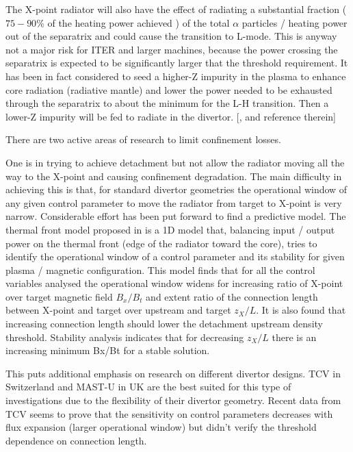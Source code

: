 The X-point radiator will also have the effect of radiating a substantial fraction ($75-90\%$ of the heating power achieved \cite{Bernert2017}) of the total $ \alpha $ particles / heating power out of the separatrix and could cause the transition to L-mode. This is anyway not a major risk for ITER and larger machines, because the power crossing the separatrix is expected to be significantly larger that the threshold requirement. It has been in fact considered to seed a higher-Z impurity in the plasma to enhance core radiation (radiative mantle) and lower the power needed to be exhausted through the separatrix to about the minimum for the L-H transition. Then a lower-Z impurity will be fed to radiate in the divertor. [\cite{Kallenbach2015a},\cite{Reinke2013} and reference therein]


There are two active areas of research to limit confinement losses.

One is in trying to achieve detachment but not allow the radiator moving all the way to the X-point and causing confinement degradation. The main difficulty in achieving this is that, for standard divertor geometries the operational window of any given control parameter to move the radiator from target to X-point is very narrow. Considerable effort has been put forward to find a predictive model. The thermal front model proposed in \cite{Lipschultz2016} is a 1D model that, balancing input / output power on the thermal front (edge of the radiator toward the core), tries to identify the operational window of a control parameter and its stability for given plasma / magnetic configuration. This model finds that for all the control variables analysed the operational window widens for increasing ratio of X-point over target magnetic field $B_x/B_t$ and extent ratio of the connection length between X-point and target over upstream and target $z_X/L$. It is also found that increasing connection length should lower the detachment upstream density threshold. Stability analysis indicates that for decreasing $z_X/L$ there is an increasing minimum Bx/Bt for a stable solution.\cite{Lipschultz2016}

This puts additional emphasis on research on different divertor designs. TCV in Switzerland and MAST-U in UK are the best suited for this type of investigations due to the flexibility of their divertor geometry. Recent data from TCV seems to prove that the sensitivity on control parameters decreases with flux expansion (larger operational window) but didn’t verify the threshold dependence on connection length. \cite{Theiler2017}

